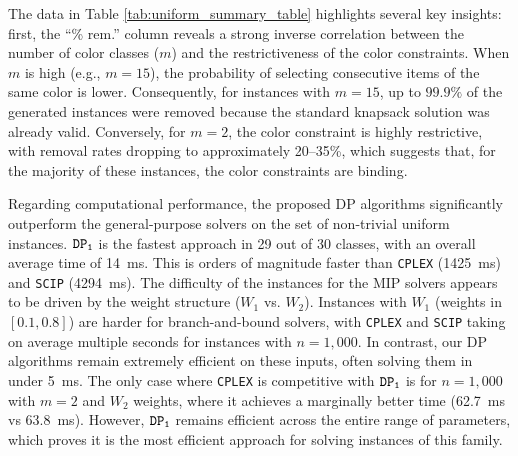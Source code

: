 \documentclass[preprint,11pt]{elsarticle}
\newcommand{\firstDP}{{\tt DP_1}}
\theoremstyle{definition}
\begin{document}
The data in Table \ref{tab:uniform_summary_table} highlights several key insights: first, the ``\% rem.'' column reveals a strong inverse correlation between the number of color classes ($m$) and the restrictiveness of the color constraints. When $m$ is high (e.g., $m=15$), the probability of selecting consecutive items of the same color is lower. Consequently, for instances with $m=15$, up to $99.9\%$ of the generated instances were removed because the standard knapsack solution was already valid. Conversely, for $m=2$, the color constraint is highly restrictive, with removal rates dropping to approximately 20--35\%, which suggests that, for the majority of these instances, the color constraints are binding.

Regarding computational performance, the proposed DP algorithms significantly outperform the general-purpose solvers on the set of non-trivial uniform instances. $\firstDP$ is the fastest approach in 29 out of 30 classes, with an overall average time of \qty{14}{\milli\second}. This is orders of magnitude faster than {\tt CPLEX} (\qty{1425}{\milli\second}) and {\tt SCIP} (\qty{4294}{\milli\second}).
The difficulty of the instances for the MIP solvers appears to be driven by the weight structure ($W_1$ vs. $W_2$). Instances with $W_1$ (weights in $[0.1, 0.8]$) are harder for branch-and-bound solvers, with {\tt CPLEX} and {\tt SCIP} taking on average multiple seconds for instances with $n=1,000$. In contrast, our DP algorithms remain extremely efficient on these inputs, often solving them in under \qty{5}{ms}. 
The only case where {\tt CPLEX} is competitive with $\firstDP$ is for $n=1,000$ with $m=2$ and $W_2$ weights, where it achieves a marginally better time (\qty{62.7}{\milli\second} vs \qty{63.8}{\milli\second}).
However, $\firstDP$ remains efficient across the entire range of parameters, which proves it is the most efficient approach for solving instances of this family.
\end{document}

